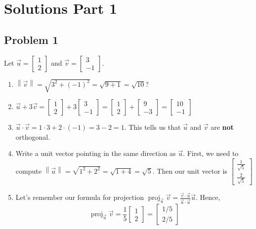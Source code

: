 \documentclass[11pt]{article}
\begin{document}
\clearpage

\section*{Solutions Part 1}
\subsection*{Problem 1}
Let $\vec{u}=\begin{bmatrix}
    1\\ 2
\end{bmatrix}$ and $\vec{v}=\begin{bmatrix}
    3\\ -1
\end{bmatrix}$.
\begin{enumerate}
    \item[(a)] $\left\|\vec{v}\right\| = \sqrt{3^2 + \left(-1\right)^2}=\sqrt{9+1}=\sqrt{10}$?
    \item[(b)] $\vec{u}+3\vec{v}= \begin{bmatrix}1\\ 2\end{bmatrix}+3\begin{bmatrix}3\\ -1\end{bmatrix}= \begin{bmatrix}1\\ 2\end{bmatrix}+\begin{bmatrix}9\\ -3\end{bmatrix}=\begin{bmatrix}10\\ -1\end{bmatrix}$
    \item[(c)] $\vec{u}\cdot \vec{v}=1\cdot 3 + 2\cdot \left(-1\right)=3-2=1$. This tells us that $\vec{u}$ and $\vec{v}$ are \textbf{not} orthogonal.
    \item[(d)] Write a unit vector pointing in the same direction as $\vec{u}$. First, we need to compute $\left\|\vec{u}\right\| = \sqrt{1^2+2^2}=\sqrt{1+4}=\sqrt{5}$. Then our unit vector is $\begin{bmatrix}\frac{1}{\sqrt{5}}\\ \frac{2}{\sqrt{5}}\end{bmatrix}$
    \item[(e)] Let's remember our formula for projection $\operatorname{proj}_{\vec{u}}\vec{v}=\frac{\vec{v}\cdot \vec{u}}{\vec{u}\cdot \vec{u}}\vec{u}$. Hence, \[ \operatorname{proj}_{\vec{u}}\vec{v}=\frac{1}{5} \begin{bmatrix}
    1\\ 2
\end{bmatrix}= \begin{bmatrix}
    1/5 \\ 2/5
\end{bmatrix} \]
\end{enumerate}
\end{document}
